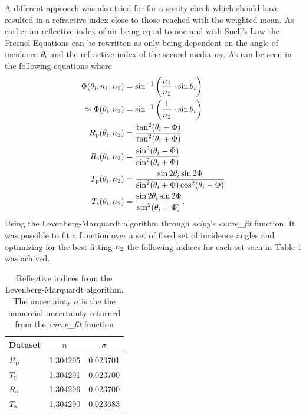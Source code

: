 A different approach was also tried for for a sanity check which should have resulted in a refractive index close to those reached with the weighted mean.
As earlier an reflective index of air being equal to one and with Snell's Law the Fresnel Equations can be rewritten as only being dependent on the angle of incidence $\theta_{\textup{i}}$ and the refractive index of the second media $n_{\textup{2}}$. 
As can be seen in the following equations where
\begin{align*}
    \Phi(\theta_{\textup{i}}, n_{\textup{1}}, n_{\textup{2}}) &= \sin^{-1}\left(\frac{n_{\textup{1}}}{n_{\textup{2}}} \cdot \sin\theta_i\right) \\ 
    \approx \Phi (\theta_{\textup{i}}, n_{\textup{2}}) &= \sin^{-1}\left(\frac{1}{n_{\textup{2}}} \cdot \sin\theta_i\right)\\
    R_{\textup{p}}(\theta_{\textup{i}}, n_{\textup{2}}) &= \frac{\tan^{2}(\theta_i - \Phi)}{\tan^{2}(\theta_i + \Phi)}\\
    R_{\textup{s}}(\theta_{\textup{i}}, n_{\textup{2}}) &= \frac{\sin^{2}(\theta_i - \Phi)}{\sin^{2}(\theta_i + \Phi)}\\
    T_{\textup{p}}(\theta_{\textup{i}}, n_{\textup{2}}) &= \frac{\sin{2\theta_i}\sin{2\Phi}}{\sin^{2}(\theta_i + \Phi)\cos^{2}(\theta_i - \Phi)}\\
    T_{\textup{s}}(\theta_{\textup{i}}, n_{\textup{2}}) &= \frac{\sin{2\theta_i}\sin{2\Phi}}{\sin^{2}(\theta_i + \Phi)}.\\
\end{align*}
Using the Levenberg-Marquardt algorithm through \textit{scipy}'s \textit{curve\_fit} function. It was possible to fit a function over a set of fixed set of incidence angles and optimizing for the best fitting $n_{\textup{2}}$ the following indices for each set seen in Table 1 was achived.
\begin{table}[!ht]
    \caption{Reflective indices from the Levenberg-Marquardt algorithm. The uncertainty $\sigma$ is the the numercial uncertainty returned from the \textit{curve\_fit} function}
    \centering
    \begin{tabular}{lcc}
        \hline\hline
        Dataset & $n$ & $\sigma$ \\
        \hline
        \rule{0pt}{1.1em}\noindent
        $R_{\textup{p}}$ & 1.304295 & 0.023701 \\
        $T_{\textup{p}}$ & 1.304291 & 0.023700 \\
        $R_{\textup{s}}$ & 1.304296 & 0.023700 \\
        $T_{\textup{s}}$ & 1.304290 & 0.023683 \\
        \hline
    \end{tabular}
\end{table}
